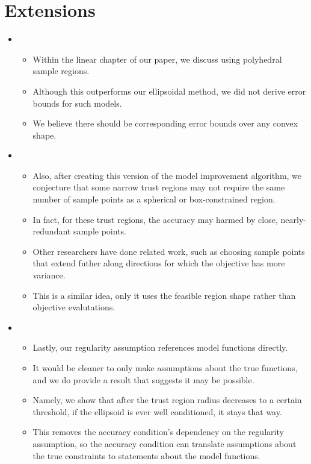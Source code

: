 \documentclass{article}
\begin{document}
	\section{Extensions}
\begin{itemize}
\item \begin{itemize}
\item Within the linear chapter of our paper, we discuss using polyhedral sample regions.
\item Although this outperforms our ellipsoidal method, we did not derive error bounds for such models.
\item We believe there should be corresponding error bounds over any convex shape.
\end{itemize}

\item \begin{itemize}
\item Also, after creating this version of the model improvement algorithm, we conjecture that some narrow trust regions may not require the same number of sample points as a spherical or box-constrained region.
\item In fact, for these trust regions, the accuracy may harmed by close, nearly-redundant sample points.
\item Other researchers have done related work, such as choosing sample points that extend futher along directions for which the objective has more variance.
\item This is a similar idea, only it uses the feasible region shape rather than objective evalutations.
\end{itemize}

\item \begin{itemize}
\item Lastly, our regularity assumption references model functions directly.
\item It would be cleaner to only make assumptions about the true functions, and we do provide a result that suggests it may be possible.
\item Namely, we show that after the trust region radius decreases to a certain threshold, if the ellipsoid is ever well conditioned, it stays that way.
\item This removes the accuracy condition's dependency on the regularity assumption, so the accuracy condition can translate assumptions about the true constraints to statements about the model functions.
\end{itemize}
\end{itemize}






\end{document}
